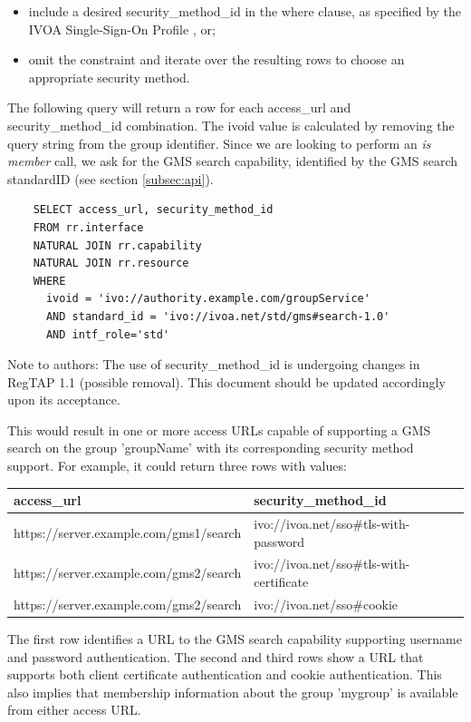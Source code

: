 \documentclass[11pt,a4paper]{ivoa}
\begin{document}
\begin{itemize}
\item include a desired security\_method\_id in the where clause, as specified by the IVOA Single-Sign-On Profile \citep{2017ivoa.spec.0524T}, or;
\item omit the constraint and iterate over the resulting rows to choose an appropriate security method.
\end{itemize}

The following query will return a row for each access\_url and security\_method\_id combination.  The ivoid value is calculated by removing the query string from the group identifier.  Since we are looking to perform an \emph{is member} call, we ask for the GMS search capability, identified by the GMS search standardID (see section \ref{subsec:api}).

\begin{verbatim}
    SELECT access_url, security_method_id
    FROM rr.interface
    NATURAL JOIN rr.capability
    NATURAL JOIN rr.resource
    WHERE
      ivoid = 'ivo://authority.example.com/groupService'
      AND standard_id = 'ivo://ivoa.net/std/gms#search-1.0'
      AND intf_role='std'
\end{verbatim}

Note to authors:  The use of security\_method\_id is undergoing changes in RegTAP 1.1 (possible removal).  This document should be updated accordingly upon its acceptance.

This would result in one or more access URLs capable of supporting a GMS search on the group 'groupName' with its corresponding security method support.  For example, it could return three rows with values:

\vspace{3mm}
\hskip-1.0cm
\begin{tabular}{l l}
\textbf{access\_url} & \textbf{security\_method\_id} \\
\hline
https://server.example.com/gms1/search & ivo://ivoa.net/sso\#tls-with-password \\
https://server.example.com/gms2/search & ivo://ivoa.net/sso\#tls-with-certificate \\
https://server.example.com/gms2/search & ivo://ivoa.net/sso\#cookie \\
\hline
\end{tabular}
\vspace{3mm}

The first row identifies a URL to the GMS search capability supporting username and password authentication.  The second and third rows show a URL that supports both client certificate authentication and cookie authentication.  This also implies that membership information about the group 'mygroup' is available from either access URL.
\end{document}
